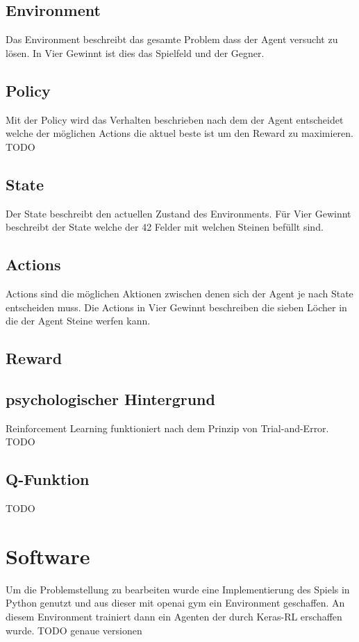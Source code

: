 \subsection{Environment}
Das Environment beschreibt das gesamte Problem dass der Agent versucht zu lösen.
In Vier Gewinnt ist dies das Spielfeld und der Gegner. 

\subsection{Policy}
Mit der Policy wird das Verhalten beschrieben nach dem der Agent entscheidet welche der möglichen Actions die aktuel beste ist um den Reward zu maximieren.\\
\colorbox{red!30}{TODO} %

\subsection{State}
Der State beschreibt den actuellen Zustand des Environments.
Für Vier Gewinnt beschreibt der State welche der 42 Felder mit welchen Steinen befüllt sind. 

\subsection{Actions}
Actions sind die möglichen Aktionen zwischen denen sich der Agent je nach State entscheiden muss.
Die Actions in Vier Gewinnt beschreiben die sieben Löcher in die der Agent Steine werfen kann.

\subsection{Reward}

\subsection{psychologischer Hintergrund}
Reinforcement Learning funktioniert nach dem Prinzip von Trial-and-Error.\\
\colorbox{red!30}{TODO} %

\subsection{Q-Funktion}
\colorbox{red!30}{TODO} %


\section{Software}
Um die Problemstellung zu bearbeiten wurde eine Implementierung des Spiels in Python genutzt und aus dieser mit openai gym ein Environment geschaffen. An diesem Environment trainiert dann ein Agenten der durch Keras-RL erschaffen wurde.
\colorbox{red!30}{TODO genaue versionen}

